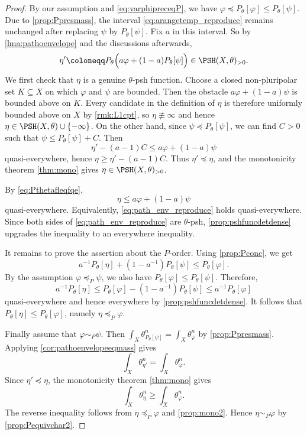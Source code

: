 \begin{proof}
    By our assumption and \eqref{eq:varphipreceqP}, we have $\varphi\preceq P_{\theta}[\varphi]\leq P_{\theta}[\psi]$.
    Due to \cref{prop:Ppresmass}, the interval \eqref{eq:arangetemp_reproduce} remains unchanged after replacing $\psi$ by $P_{\theta}[\psi]$. Fix $a$ in this interval.
    So by \cref{lma:pathoenvelope} and the discussions afterwards,
    \[
        \eta'\coloneqq  P_{\theta}\Bigl(a\varphi+(1-a)P_{\theta}[\psi]\Bigr)\in \PSH(X,\theta)_{>0}.
    \]
    We first check that $\eta$ is a genuine $\theta$-psh function. Choose a closed non-pluripolar set $K\subseteq X$ on which $\varphi$ and $\psi$ are bounded. Then the obstacle $a\varphi+(1-a)\psi$ is bounded above on $K$.
    Every candidate in the definition of $\eta$ is therefore uniformly bounded above on $X$ by \cref{rmk:L1cpt}, so $\eta\not\equiv \infty$ and hence $\eta\in \PSH(X,\theta)\cup\{-\infty\}$.
    On the other hand, since $\psi\preceq P_{\theta}[\psi]$, we can find $C>0$ such that $\psi\leq P_{\theta}[\psi]+C$. Then
    \[
        \eta'-(a-1)C\leq a\varphi+(1-a)\psi
    \]
    quasi-everywhere, hence $\eta\geq \eta'-(a-1)C$. Thus $\eta'\preceq \eta$, and the monotonicity theorem \cref{thm:mono} gives $\eta\in \PSH(X,\theta)_{>0}$.

    By \eqref{eq:Pthetafleqfqe},
    \[
        \eta\leq a\varphi+(1-a)\psi
    \]
    quasi-everywhere. Equivalently, \eqref{eq:path_env_reproduce} holds quasi-everywhere. Since both sides of \eqref{eq:path_env_reproduce} are $\theta$-psh, \cref{prop:pshfuncdetdense} upgrades the inequality to an everywhere inequality.

    It remains to prove the assertion about the $P$-order.
    Using \cref{prop:Pconc}, we get
    \[
        a^{-1} P_{\theta}[\eta]+\left(1-a^{-1}\right)P_{\theta}[\psi] \leq P_{\theta}[\varphi].
    \]
    By the assumption $\varphi\preceq_P\psi$, we also have $P_{\theta}[\varphi]\leq P_{\theta}[\psi]$. Therefore,
    \[
        a^{-1} P_{\theta}[\eta]\leq P_{\theta}[\varphi]-\left(1-a^{-1}\right)P_{\theta}[\psi]\leq a^{-1} P_{\theta}[\varphi]
    \]
    quasi-everywhere and hence everywhere by \cref{prop:pshfuncdetdense}. It follows that $P_{\theta}[\eta]\leq P_{\theta}[\varphi]$, namely $\eta\preceq_P\varphi$.

    Finally assume that $\varphi\sim_P\psi$. Then $\int_X\theta_{P_{\theta}[\psi]}^n=\int_X\theta_{\varphi}^n$ by \cref{prop:Ppresmass}.
    Applying \cref{cor:pathoenvelopeeqmass} gives
    \[
        \int_X\theta_{\eta'}^n=\int_X\theta_{\varphi}^n.
    \]
    Since $\eta'\preceq\eta$, the monotonicity theorem \cref{thm:mono} gives
    \[
        \int_X\theta_{\eta}^n\geq \int_X\theta_{\varphi}^n.
    \]
    The reverse inequality follows from $\eta\preceq_P\varphi$ and \cref{prop:mono2}. Hence $\eta\sim_P\varphi$ by \cref{prop:Pequivchar2}.
\end{proof}


